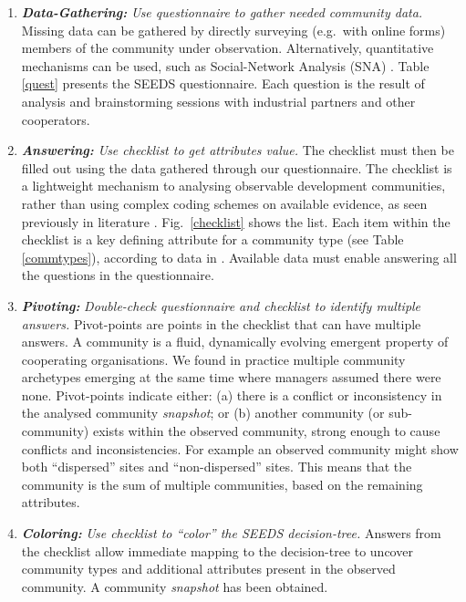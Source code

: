 \begin{enumerate}

\item \emph{\bf Data-Gathering:} \emph{Use questionnaire to gather needed community data.}
Missing data can be gathered by directly surveying (e.g.~with online forms) members of the community under observation. Alternatively, quantitative mechanisms can be used, such as Social-Network Analysis (SNA) \cite{Rosso2009}. Table \ref{quest} presents the SEEDS questionnaire. Each question is the result of analysis and brainstorming sessions with industrial partners and other cooperators. 

\item \emph{\bf Answering:} \emph{Use checklist to get attributes value.}
The checklist must then be filled out using the data gathered through our questionnaire. The checklist is a lightweight mechanism to analysing observable development communities, rather than using complex coding schemes on available evidence, as seen previously in literature \cite{Rosso2009,Hustad2010}. Fig.~\ref{checklist} shows the list. Each item within the checklist is a key defining attribute for a community type (see Table \ref{commtypes}), according to data in \cite{ossslr}. Available data must enable answering all the questions in the questionnaire.

\item \emph{\bf Pivoting:} \emph{Double-check questionnaire and checklist to identify multiple answers.}
Pivot-points are points in the checklist that can have multiple answers. A community is a fluid, dynamically evolving emergent property of cooperating organisations. We found in practice multiple community archetypes emerging at the same time where managers assumed there were none. Pivot-points indicate either: (a) there is a conflict or inconsistency in the analysed community \emph{snapshot}; or (b) another community (or sub-community) exists within the observed community, strong enough to cause conflicts and inconsistencies. For example an observed community might show both ``dispersed'' sites and ``non-dispersed'' sites. This means that the community is the sum of multiple communities, based on the remaining attributes.

\item \emph{\bf Coloring:} \emph{Use checklist to ``color'' the SEEDS decision-tree.}
Answers from the checklist allow immediate mapping to the decision-tree to uncover community types and additional attributes present in the observed community. A community \emph{snapshot} has been obtained.


\end{enumerate}
